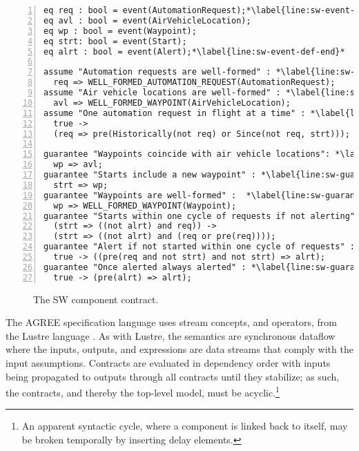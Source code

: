 \newsavebox{\sw}
\begin{lrbox}{\sw}
\begin{lstlisting}[style=agree,numbers=left]
eq req : bool = event(AutomationRequest);*\label{line:sw-event-def-start}*
eq avl : bool = event(AirVehicleLocation);
eq wp : bool = event(Waypoint);
eq strt: bool = event(Start);
eq alrt : bool = event(Alert);*\label{line:sw-event-def-end}*

assume "Automation requests are well-formed" : *\label{line:sw-assume-1}*
  req => WELL_FORMED_AUTOMATION_REQUEST(AutomationRequest);
assume "Air vehicle locations are well-formed" : *\label{line:sw-assume-2}*
  avl => WELL_FORMED_WAYPOINT(AirVehicleLocation);    
assume "One automation request in flight at a time" : *\label{line:sw-assume-3}*
  true -> 
  (req => pre(Historically(not req) or Since(not req, strt)));
      
guarantee "Waypoints coincide with air vehicle locations": *\label{line:sw-guarantee-1}*
  wp => avl;
guarantee "Starts include a new waypoint" : *\label{line:sw-guarantee-2}*
  strt => wp;
guarantee "Waypoints are well-formed" :  *\label{line:sw-guarantee-3}*
  wp => WELL_FORMED_WAYPOINT(Waypoint);
guarantee "Starts within one cycle of requests if not alerting" : *\label{line:sw-guarantee-4}*
  (strt => ((not alrt) and req)) -> 
  (strt => ((not alrt) and (req or pre(req))));
guarantee "Alert if not started within one cycle of requests" : *\label{line:sw-guarantee-5}*
  true -> ((pre(req and not strt) and not strt) => alrt);
guarantee "Once alerted always alerted" : *\label{line:sw-guarantee-6}*
  true -> (pre(alrt) => alrt);
\end{lstlisting}
\end{lrbox}

\begin{figure}
  \begin{center}
    \scalebox{0.62}{\usebox{\sw}}
  \end{center}
  \caption{The SW component contract.}
  \label{fig:sw}
\end{figure}

The AGREE specification language uses stream concepts, and operators, from the Lustre language \cite{10.1145/41625.41641}.
As with Lustre, the semantics are synchronous dataflow where the inputs, outputs, and expressions are data streams that comply with the input assumptions.
Contracts are evaluated in dependency order with inputs being propagated to outputs through all contracts until they stabilize; as such, the contracts, and thereby the top-level model, must be acyclic.\footnote{An apparent syntactic cycle, where a component is linked back to itself, may be broken temporally by inserting delay elements.}

